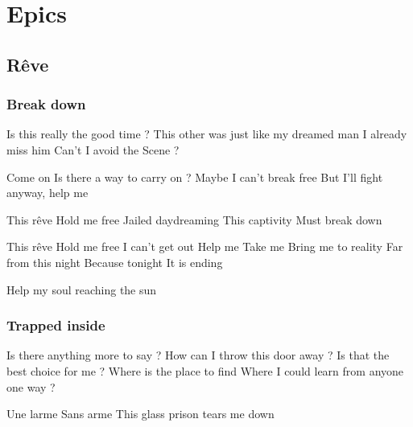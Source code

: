 \documentclass{article}
\newenvironment{album}[1]%
{%
  \section*{#1}
}%
{%
}
\newenvironment{song}[1]%
{%
  \subsection*{\textbf{#1}}
  \begin{multicols*}{2}
}%
{%
  \end{multicols*}
  \newpage
}
\newenvironment{partie}[1]%
{%
  \subsubsection{#1}
}%
{%
}
\newenvironment{couplet} %
{%
  \verbatim
}%
{% end code
  \endverbatim
}
\newenvironment{refrain} %
{%
  \verbatim
}%
{% end code
  \endverbatim
}
\begin{document}
\begin{album}{Epics}
\begin{song}{Rêve}
\begin{partie}{Break down}
\begin{couplet}
Is this really the good time ?
This other was just like my dreamed man
I already miss him
Can't I avoid the Scene ?  
\end{couplet}
\begin{couplet}
Come on
Is there a way to carry on ?
Maybe I can't break free
But I'll fight anyway, help me 
\end{couplet}
\begin{refrain}
This rêve
Hold me free
Jailed daydreaming
This captivity
Must break down 
\end{refrain}
\begin{refrain}
This rêve
Hold me free
I can't get out
Help me
Take me
Bring me to reality 
Far from this night
Because tonight
It is ending 
\end{refrain}
\begin{refrain}
Help my soul reaching the sun  
\end{refrain} 
\end{partie}
\begin{partie}{Trapped inside}
\begin{couplet}
Is there anything more to say ?
How can I throw this door away ?
Is that the best choice for me ?
Where is the place to find
Where I could learn from anyone
one way ?
\end{couplet}
\begin{couplet}
Une larme
Sans arme
This glass prison tears me down  
\end{couplet}
\end{partie}
\end{song}


\end{album}
\end{document}
